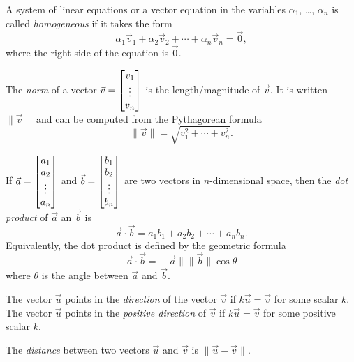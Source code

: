 \begin{SaveDefinition}[
	key=HomogeneousSystem,
	title={Homogeneous System}]

	A system of linear equations or a vector equation in the variables $\alpha_1$, \ldots, 
	$\alpha_n$ is called
	\emph{homogeneous} if it takes the form
	\[
		\alpha_1\vec v_1+\alpha_2\vec v_2+\cdots +\alpha_n\vec v_n=\vec 0,
	\]
	where the right side of the equation is $\vec 0$.
\end{SaveDefinition}


\begin{SaveDefinition}[key=Norm, title={Norm}]
	The
	\emph{norm} of a vector $\vec v=\begin{bmatrix}v_1\\\vdots\\v_n\end{bmatrix}$ is the length/magnitude
	of $\vec v$. It is written $\|\vec v\|$ and can be computed from the Pythagorean
	formula
	\[
		\|\vec v\|=\sqrt{v_1^2+\cdots +v_n^2}.
	\]

\end{SaveDefinition}

\begin{SaveDefinition}[key=DotProduct, title={Dot Product}]
	If $\vec a=\begin{bmatrix}a_1\\a_2\\ \vdots\\a_n\end{bmatrix}$ and
	$\vec b=\begin{bmatrix}b_1\\b_2\\ \vdots\\b_n\end{bmatrix}$ are two vectors in $n$-dimensional
	space, then the
	\emph{dot product} of $\vec a$ an $\vec b$ is
	\[
		\vec a\cdot\vec b = a_{1}b_{1}+a_{2}b_{2}+\cdots+a_{n}b_{n}.
	\]
	 Equivalently, the dot product is defined by the geometric formula
	\[
		\vec a\cdot \vec b = \|\vec a\|\|\vec b\|\cos \theta
	\]
	 where $\theta$ is the angle between $\vec a$ and $\vec b$.
\end{SaveDefinition}

\begin{SaveDefinition}[key=Direction, title={Direction}]
	The vector $\vec u$ points in the \emph{direction} of
	the vector $\vec v$ if $k\vec u=\vec v$ for some scalar $k$.
	The vector $\vec u$ points in the \emph{positive direction} of
	$\vec v$ if $k\vec u=\vec v$ for some positive scalar $k$.
\end{SaveDefinition}

\begin{SaveDefinition}[key=Distance, title={Distance}]
	The
	\emph{distance} between two vectors $\vec u$ and $\vec v$ is
	$\|\vec u-\vec v\|$.
\end{SaveDefinition}

